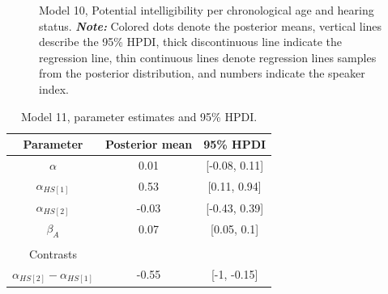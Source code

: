 \documentclass[
  authoryear,
  preprint,
  1p]{elsarticle}
\begin{document}
\label{cell-fig-rq3-intelligibility-model10}
\begin{figure}[H]


\caption{\label{fig-rq3-intelligibility-model10}Model 10, Potential
intelligibility per chronological age and hearing status.
{\textbf{\emph{Note:}} Colored dots denote the posterior means, vertical
lines describe the 95\% HPDI, thick discontinuous line indicate the
regression line, thin continuous lines denote regression lines samples
from the posterior distribution, and numbers indicate the speaker
index.}}

\end{figure}%

\begin{longtable}[]{@{}ccc@{}}

\caption{\label{tbl-parameter-model11}{Model 11, parameter estimates and
95\% HPDI.}}

\tabularnewline

\toprule\noalign{}
Parameter & Posterior mean & 95\% HPDI \\
\midrule\noalign{}
\endhead
\bottomrule\noalign{}
\endlastfoot
\(\alpha\) & 0.01 & {[}-0.08, 0.11{]} \\
\(\alpha_{HS[1]}\) & 0.53 & {[}0.11, 0.94{]} \\
\(\alpha_{HS[2]}\) & -0.03 & {[}-0.43, 0.39{]} \\
\(\beta_{A}\) & 0.07 & {[}0.05, 0.1{]} \\
& & \\
Contrasts & & \\
\(\alpha_{HS[2]} - \alpha_{HS[1]}\) & -0.55 & {[}-1, -0.15{]} \\

\end{longtable}
\end{document}
